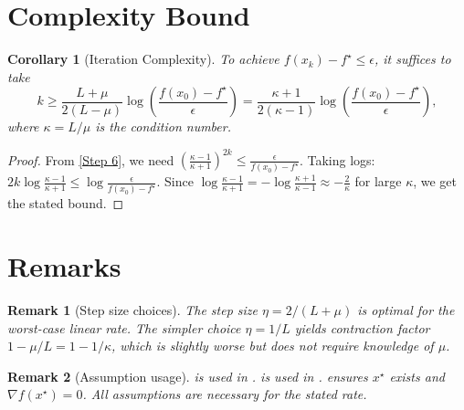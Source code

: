 \documentclass{article}
\newtheorem{corollary}{Corollary}
\newtheorem{remark}{Remark}
\newcommand{\stepsize}{\eta}
\newcommand{\lipschitz}{L}
\newcommand{\strongconvex}{\mu}
\newcommand{\opt}{x^\star}
\newcommand{\grad}{\nabla}
\begin{document}
\section{Complexity Bound}

\begin{corollary}[Iteration Complexity] \label{cor:complexity}
    To achieve $f(x_k) - f^\star \le \epsilon$, it suffices to take
    \begin{equation}
        k \ge \frac{\lipschitz + \strongconvex}{2(\lipschitz - \strongconvex)} \log \left( \frac{f(x_0) - f^\star}{\epsilon} \right) = \frac{\kappa + 1}{2(\kappa - 1)} \log \left( \frac{f(x_0) - f^\star}{\epsilon} \right), \tag{Step 22}
    \end{equation}
    where $\kappa = \lipschitz / \strongconvex$ is the condition number.
\end{corollary}

\begin{proof}
    From \eqref{Step 6}, we need $\left( \frac{\kappa - 1}{\kappa + 1} \right)^{2k} \le \frac{\epsilon}{f(x_0) - f^\star}$.
    Taking logs: $2k \log \frac{\kappa - 1}{\kappa + 1} \le \log \frac{\epsilon}{f(x_0) - f^\star}$.
    Since $\log \frac{\kappa - 1}{\kappa + 1} = -\log \frac{\kappa + 1}{\kappa - 1} \approx -\frac{2}{\kappa}$ for large $\kappa$, we get the stated bound.
\end{proof}

\section{Remarks}

\begin{remark}[Step size choices]
    The step size $\stepsize = 2/(\lipschitz + \strongconvex)$ is optimal for the worst-case linear rate. The simpler choice $\stepsize = 1/\lipschitz$ yields contraction factor $1 - \strongconvex/\lipschitz = 1 - 1/\kappa$, which is slightly worse but does not require knowledge of $\strongconvex$.
\end{remark}

\begin{remark}[Assumption usage]
     is used in .  is used in .  ensures $\opt$ exists and $\grad f(\opt)=0$. All assumptions are necessary for the stated rate.
\end{remark}
\end{document}
